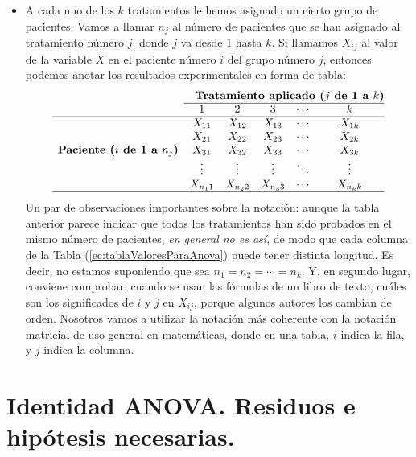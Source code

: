 \begin{itemize}
    \item A cada uno de los $k$ tratamientos le hemos asignado un cierto grupo de pacientes. Vamos a llamar $n_j$ al número de pacientes que se han asignado al tratamiento número $j$, donde $j$ va desde 1 hasta $k$. Si llamamos $X_{ij}$ al valor de la variable $X$ en el paciente número $i$ del grupo número $j$, entonces podemos anotar los resultados experimentales en forma de tabla:
        \begin{equation}\label{ec:tablaValoresParaAnova}
        \begin{array}{cccccc}
        &\multicolumn{5}{r}\mbox{\bf Tratamiento aplicado ($j$ de 1 a $k$)}\\
        \cline{2-6}
        &1&2&3&\cdots&k\\
        \hline
        \multirow{5}{*}{\mbox{\bf Paciente ($i$ de 1 a $n_j$)}}
        &X_{11}&X_{12}&X_{13}&\cdots&X_{1k}\\
        &X_{21}&X_{22}&X_{23}&\cdots&X_{2k}\\
        &X_{31}&X_{32}&X_{33}&\cdots&X_{3k}\\
        &\vdots&\vdots&\vdots&\ddots&\vdots\\
        &X_{n_11}&X_{n_22}&X_{n_33}&\cdots&X_{n_kk}\\
        \hline
        \end{array}
        \end{equation}
        {\sf Un par de observaciones importantes sobre la notación:} aunque la tabla anterior parece indicar que todos los tratamientos han sido probados en el mismo número de pacientes, {\em en general no es así}, de modo que cada columna de la Tabla (\ref{ec:tablaValoresParaAnova}) puede tener distinta longitud. Es decir, {\sf no estamos suponiendo} que sea $n_1=n_2=\cdots=n_k$. Y, en segundo lugar, conviene comprobar, cuando se usan las fórmulas de un libro de texto, cuáles son los significados de $i$ y $j$ en $X_{ij}$, porque algunos autores los cambian de orden. Nosotros vamos a utilizar la notación más coherente con la notación matricial de uso general en matemáticas, donde en una tabla, $i$ indica la fila, y $j$ indica la columna.

\end{itemize}

\section{Identidad ANOVA. Residuos e hipótesis necesarias.}

